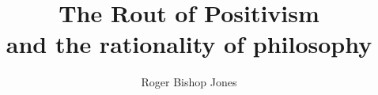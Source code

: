\usepackage[T1]{fontenc}
\usepackage{textcomp}
\renewcommand{\rmdefault}{ppl}
\linespread{1.04}

\makeatletter
\def\cleardoublepage{\clearpage\if@twoside \ifodd\c@page\else
\hbox{}
\vspace*{\fill}
\begin{center}
\end{center}
\vspace{\fill}
\thispagestyle{empty}
\newpage
\if@twocolumn\hbox{}\newpage\fi\fi\fi}
\makeatother

\usepackage{fancyhdr}
\pagestyle{fancyplain}

\usepackage[twoside,paperwidth=5in,paperheight=8in,hmargin={0.75in,0.5in},vmargin={0.5in,0.5in},includehead,includefoot]{geometry}
\usepackage{tocloft}
\usepackage{tocbibind}
\makeindex
\newcommand{\indexentry}[2]{\item #1 #2}
\newcommand{\ignore}[1]{}

\fancyhfoffset[EL,RO]{0pt}
\newcommand{\aref}{}
\newcommand{\bookname}{}
\renewcommand{\chaptermark}[1]{\markboth{#1}{}}
\renewcommand{\sectionmark}[1]{\markright{#1}}
\lhead[\fancyplain{}{\thepage}]         {\fancyplain{}{}}
\chead[\fancyplain{}{\slshape\leftmark}]                 {\fancyplain{}{\slshape\rightmark}}
\rhead[\fancyplain{}{}]       {\fancyplain{}{\thepage}}
\lfoot[\fancyplain{}{\aref}]            {\fancyplain{}{}}
\cfoot[\fancyplain{}{}]                 {\fancyplain{}{}}
\rfoot[\fancyplain{}{}]                 {\fancyplain{}{\aref}}

\renewcommand{\headrulewidth}{0pt}

\title{The Rout of Positivism \\ {\large and the rationality of philosophy}}
\author{Roger Bishop Jones}
\date{\ }


\frontmatter


